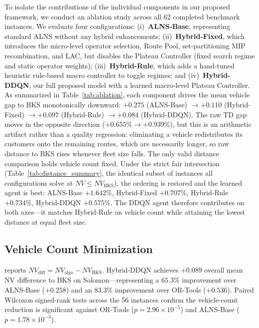 \documentclass[conference]{IEEEtran}
\newcommand{\BKS}{\text{BKS}}
\begin{document}
To isolate the contributions of the individual components in our proposed framework, we conduct an ablation study across all 62 completed benchmark instances. We evaluate four configurations:
(i)~\textbf{ALNS-Base}, representing standard ALNS without any hybrid enhancements;
(ii)~\textbf{Hybrid-Fixed}, which introduces the micro-level operator selection, Route Pool, set-partitioning MIP recombination, and LAC, but disables the Plateau Controller (fixed search regime and static operator weights);
(iii)~\textbf{Hybrid-Rule}, which adds a hand-tuned heuristic rule-based macro controller to toggle regimes; and
(iv)~\textbf{Hybrid-DDQN}, our full proposed model with a learned macro-level Plateau Controller.
As summarized in Table~\ref{tab:ablation}, each component drives the mean vehicle
gap to BKS monotonically downward: $+0.275$ (ALNS-Base) $\rightarrow +0.110$
(Hybrid-Fixed) $\rightarrow +0.097$ (Hybrid-Rule) $\rightarrow \mathbf{+0.084}$
(Hybrid-DDQN). The raw TD gap moves in the opposite direction ($+0.655\%
\rightarrow +0.939\%$), but this is an arithmetic artifact rather than a quality
regression: eliminating a vehicle redistributes its customers onto the remaining
routes, which are necessarily longer, so raw distance to BKS rises whenever fleet
size falls. The only valid distance comparison holds vehicle count fixed. Under
the strict fair intersection (Table~\ref{tab:distance_summary}, the identical
subset of instances all configurations solve at $NV\le NV_{\BKS}$), the ordering
is restored and the learned agent is best: ALNS-Base $+1.642\%$, Hybrid-Fixed
$+0.707\%$, Hybrid-Rule $+0.734\%$, Hybrid-DDQN $\mathbf{+0.575\%}$. The DDQN
agent therefore contributes on both axes---it matches Hybrid-Rule on vehicle
count while attaining the lowest distance at equal fleet size.

\begin{table}[!t]
\centering

\end{table}


\subsection{Vehicle Count Minimization}

 reports $NV_{\text{diff}}=NV_{\text{algo}}-NV_{\BKS}$.
Hybrid-DDQN achieves $+0.089$ overall mean NV difference to BKS on Solomon---representing a $65.3\%$ improvement over ALNS-Base ($+0.258$) and an $83.3\%$ improvement over OR-Tools ($+0.536$).  Paired Wilcoxon signed-rank tests across the 56 instances confirm the vehicle-count reduction is significant against OR-Tools ($p=2.96{\times}10^{-5}$) and ALNS-Base ($p=1.78{\times}10^{-3}$).
\end{document}
